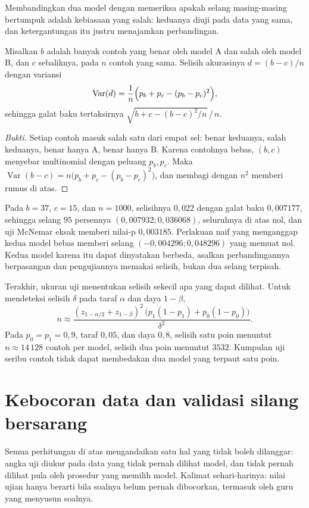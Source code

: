 Membandingkan dua model dengan memeriksa apakah selang masing-masing bertumpuk adalah
kebiasaan yang salah: keduanya diuji pada data yang sama, dan ketergantungan itu justru
menajamkan perbandingan.

\begin{proposisi}
Misalkan $b$ adalah banyak contoh yang benar oleh model A dan salah oleh model B, dan $c$
sebaliknya, pada $n$ contoh yang sama. Selisih akurasinya $d=(b-c)/n$ dengan variansi
\[
\operatorname{Var}(d)=\frac{1}{n}\Bigl(p_b+p_c-(p_b-p_c)^2\Bigr),
\]
sehingga galat baku tertaksirnya $\sqrt{b+c-(b-c)^2/n}\,/\,n$.
\end{proposisi}

\begin{proof}[Bukti]
Setiap contoh masuk salah satu dari empat sel: benar keduanya, salah keduanya, benar hanya
A, benar hanya B. Karena contohnya bebas, $(b,c)$ menyebar multinomial dengan peluang
$p_b,p_c$. Maka $\operatorname{Var}(b-c)=n\bigl(p_b+p_c-(p_b-p_c)^2\bigr)$, dan membagi
dengan $n^2$ memberi rumus di atas.
\end{proof}

Pada $b=37$, $c=15$, dan $n=1000$, selisihnya $0{,}022$ dengan galat baku $0{,}007177$,
sehingga selang $95$ persennya $(0{,}007932;0{,}036068)$, seluruhnya di atas nol, dan uji
McNemar eksak memberi nilai-p $0{,}003185$. Perlakuan naif yang menganggap kedua model
bebas memberi selang $(-0{,}004296;0{,}048296)$ yang memuat nol. Kedua model karena itu
dapat dinyatakan berbeda, asalkan perbandingannya berpasangan dan pengujiannya memakai
selisih, bukan dua selang terpisah.

Terakhir, ukuran uji menentukan selisih sekecil apa yang dapat dilihat. Untuk mendeteksi
selisih $\delta$ pada taraf $\alpha$ dan daya $1-\beta$,
\[
n\approx\frac{(z_{1-\alpha/2}+z_{1-\beta})^2\,\bigl(p_1(1-p_1)+p_0(1-p_0)\bigr)}
{\delta^2}.
\]
Pada $p_0=p_1=0{,}9$, taraf $0{,}05$, dan daya $0{,}8$, selisih satu poin menuntut
$n\approx14\,128$ contoh per model, selisih dua poin menuntut $3532$. Kumpulan uji seribu
contoh tidak dapat membedakan dua model yang terpaut satu poin.

\section{Kebocoran data dan validasi silang bersarang}

Semua perhitungan di atas mengandaikan satu hal yang tidak boleh dilanggar: angka uji
diukur pada data yang tidak pernah dilihat model, dan tidak pernah dilihat pula oleh
prosedur yang memilih model. Kalimat sehari-harinya: nilai ujian hanya berarti bila
soalnya belum pernah dibocorkan, termasuk oleh guru yang menyusun soalnya.


